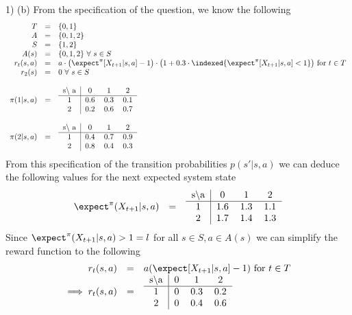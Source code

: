 \documentclass[11pt,a4paper]{article}
\begin{document}
\begin{answer}{1) (b)}
  From the specification of the question, we know the following
  \[\begin{array}{rcl}
    T&=&\{0,1\}\\
    A&=&\{0,1,2\}\\
    S&=&\{1,2\}\\
    A(s)&=&\{0,1,2\}\ \forall\ s\in S\\
    r_t(s,a)&=&a\cdot\big(\expect^\pi[X_{t+1}|s,a]-1\big)\cdot\big(1+0.3\cdot\indexed\{\expect^\pi[X_{t+1}|s,a]<1\}\big)\text{ for }t\in T\\
    r_2(s)&=&0\ \forall\ s\in S\\\\
    \pi(1|s,a)&=&\begin{tabular}{c|ccc}
      s$\setminus$ a&0&1&2\\\hline
      1&0.6&0.3&0.1\\
      2&0.2&0.6&0.7
    \end{tabular}\\\\
    \pi(2|s,a)&=&\begin{tabular}{c|ccc}
      s$\setminus$ a&0&1&2\\\hline
      1&0.4&0.7&0.9\\
      2&0.8&0.4&0.3
    \end{tabular}
  \end{array}\]
  From this specification of the transition probabilities $p(s'|s,a)$ we can deduce the following values for the next expected system state
  \[\begin{array}{rcl}
    \expect^\pi(X_{t+1}|s,a)&=&\begin{tabular}{c|ccc}
      s$\setminus$a&0&1&2\\\hline
      1&1.6&1.3&1.1\\
      2&1.7&1.4&1.3
    \end{tabular}
  \end{array}\]
  Since $\expect^\pi(X_{t+1}|s,a)>1=l$ for all $s\in S,a\in A(s)$ we can simplify the reward function to the following
  \[\begin{array}{rcl}
    r_t(s,a)&=&a(\expect[X_{t+1}|s,a]-1)\text{ for }t\in T\\
    \implies r_t(s,a)&=&\begin{tabular}{c|ccc}
      s$\setminus$a&0&1&2\\\hline
      1&0&0.3&0.2\\
      2&0&0.4&0.6
    \end{tabular}

\end{array}\]
\end{answer}
\end{document}
